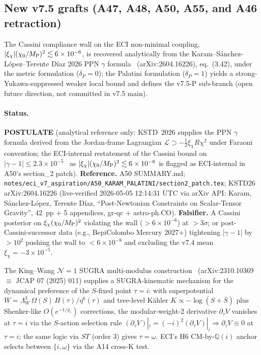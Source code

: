 \subsection{New v7.5 grafts (A47, A48, A50, A55, and A46 retraction)}
\label{sec:axioms-v75-grafts}

\begin{axiom*}
The Cassini compliance wall on the ECI non-minimal coupling,
$|\xi_\chi|(\chi_0/M_{\rm P})^2 \lesssim 6 \times 10^{-6}$, is recovered
analytically from the Karam--Sánchez-López--Terente Díaz 2026 PPN
$\gamma$ formula~\cite{KSTD26} (arXiv:2604.16226), eq.~(3.42), under
the metric formulation ($\delta_P = 0$); the Palatini formulation
($\delta_P = 1$) yields a strong-Yukawa-suppressed weaker local bound
and defines the v7.5-P sub-branch (open future direction, not committed
in v7.5 main).
\end{axiom*}

\paragraph{Status.}  \textbf{POSTULATE} (analytical reference only:
KSTD~2026 supplies the PPN $\gamma$ formula derived from the
Jordan-frame Lagrangian $\mathcal{L} \supset -\tfrac12 \xi_\chi R\chi^2$
under Faraoni convention; the ECI-internal restatement of the Cassini
bound on $|\gamma - 1|\le 2.3\times 10^{-5}$~\cite{Bertotti03} as
$|\xi_\chi|(\chi_0/M_{\rm P})^2 \lesssim 6\times 10^{-6}$ is flagged as
ECI-internal in A50's section\_2 patch).
\textbf{Reference.}  A50 SUMMARY.md;
\texttt{notes/eci\_v7\_aspiration/A50\_KARAM\_PALATINI/section2\_patch.tex};
KSTD26 arXiv:2604.16226 (live-verified 2026-05-05 12:14:31 UTC via
arXiv API: Karam, Sánchez-López, Terente Díaz, ``Post-Newtonian
Constraints on Scalar-Tensor Gravity'', 42~pp $+$ 5 appendices,
gr-qc + astro-ph.CO).
\textbf{Falsifier.}  A Cassini posterior on $\xi_\chi(\chi_0/M_{\rm P})^2$
violating the wall ($> 6\times 10^{-6}$) at $> 3\sigma$; or
post-Cassini-successor data (e.g., BepiColombo Mercury 2027+) tightening
$|\gamma - 1|$ by $> 10^{2}$ pushing the wall to $< 6\times 10^{-8}$
and excluding the v7.4 mean $\xi_\chi = -3\times 10^{-5}$.

\begin{axiom*}[$H_9'$, King--Wang multi-modulus dS-trap mechanism for $\tau=i$ (NEW v7.5)]
The King--Wang $\mathcal{N}=1$ SUGRA multi-modulus
construction~\cite{KW23} (arXiv:2310.10369 $\equiv$ JCAP 07 (2025)
011) supplies a SUGRA-kinematic mechanism for the dynamical preference
of the $S$-fixed point $\tau = i$: with superpotential $W = \Lambda_W^3
\,\Omega(S)\,H(\tau)/\eta^6(\tau)$ and tree-level Kähler $K \propto -\log
(S+\bar S)$ plus Shenker-like $O(e^{-1/g_s})$ corrections, the
modular-weight-2 derivative $\partial_\tau V$ vanishes at $\tau = i$ via
the $S$-action selection rule $(\partial_\tau V)|_i = (-i)^2
(\partial_\tau V)|_i \Rightarrow \partial_\tau V \equiv 0$ at $\tau = i$;
the same logic via $ST$ (order 3) gives $\tau = \omega$.  ECI's H6
CM-by-$\mathbb{Q}(i)$ anchor selects between $\{i, \omega\}$ via the
A14 cross-K test.
\end{axiom*}

